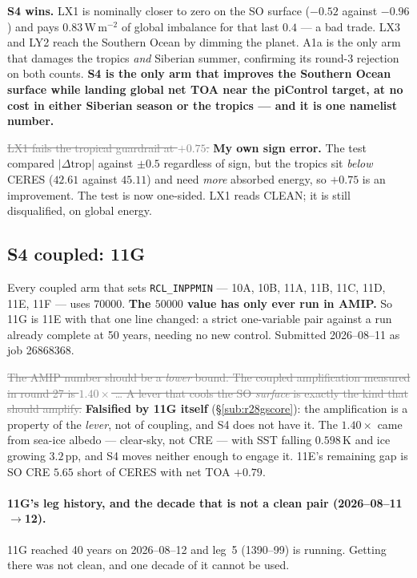 \documentclass[10pt]{article}
\newcommand{\dead}[1]{\textcolor{gray}{\sout{#1}}}
\begin{document}
\noindent \textbf{S4 wins.} LX1 is nominally closer to zero on the SO surface ($-0.52$
against $-0.96$) and pays $0.83$\,W\,m$^{-2}$ of global imbalance for that last
$0.4$ --- a bad trade. LX3 and LY2 reach the Southern Ocean by dimming the planet. A1a is
the only arm that damages the tropics \emph{and} Siberian summer, confirming its round-3
rejection on both counts. \textbf{S4 is the only arm that improves the Southern Ocean
surface while landing global net TOA near the piControl target, at no cost in either
Siberian season or the tropics --- and it is one namelist number.}

\dead{LX1 fails the tropical guardrail at $+0.75$.} \textbf{My own sign error.} The test
compared $|\Delta\mathrm{trop}|$ against $\pm0.5$ regardless of sign, but the tropics sit
\emph{below} CERES ($42.61$ against $45.11$) and need \emph{more} absorbed energy, so
$+0.75$ is an improvement. The test is now one-sided. LX1 reads CLEAN; it is still
disqualified, on global energy.

\subsection{S4 coupled: 11G}\label{sub:r28g}
Every coupled arm that sets \texttt{RCL\_INPPMIN} --- 10A, 10B, 11A, 11B, 11C, 11D, 11E,
11F --- uses $70000$. \textbf{The $50000$ value has only ever run in AMIP.} So 11G is 11E
with that one line changed: a strict one-variable pair against a run already complete at
50 years, needing no new control. Submitted 2026--08--11 as job 26868368.

\dead{The AMIP number should be a \emph{lower} bound. The coupled amplification measured
in round 27 is $1.40\times$ \dots{} A lever that cools the SO \emph{surface} is exactly the
kind that should amplify.} \textbf{Falsified by 11G itself} (\S\ref{sub:r28gscore}):
the amplification is a property of the \emph{lever}, not of coupling, and S4 does not
have it. The $1.40\times$ came from sea-ice albedo --- clear-sky, not CRE --- with SST
falling $0.598$\,K and ice growing $3.2$\,pp, and S4 moves neither enough to engage it.
11E's remaining gap is SO CRE $5.65$ short of CERES with net TOA $+0.79$.

\paragraph{11G's leg history, and the decade that is not a clean pair
(2026--08--11$\to$12).} 11G reached 40 years on 2026--08--12 and leg~5 (1390--99) is
running. Getting there was not clean, and one decade of it cannot be used.
\end{document}
